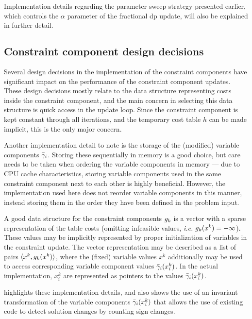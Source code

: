 Implementation details regarding the parameter sweep strategy presented earlier, which controls the \(\alpha\) parameter of the fractional \gls{dp} update, will also be explained in further detail.

\subsection{Constraint component design decisions}
Several design decisions in the implementation of the constraint components have significant impact on the performance of the constraint component updates.
These design decisions mostly relate to the data structure representing costs inside the constraint component, and the main concern in selecting this data structure is quick access in the update loop.
Since the constraint component is kept constant through all iterations, and the temporary cost table \(h\) can be made implicit, this is the only major concern.

Another implementation detail to note is the storage of the (modified) variable components \(\bar{\gamma}_i\).
Storing these sequentially in memory is a good choice, but care needs to be taken when ordering the variable components in memory --- due to CPU cache characteristics, storing variable components used in the same constraint component next to each other is highly beneficial.
However, the implementation used here does not reorder variable components in this manner, instead storing them in the order they have been defined in the problem input.

A good data structure for the constraint components \(g_k\) is a vector with a sparse representation of the table costs (omitting infeasible values, \emph{i.e.} \(g_k(x^k) = -\infty\)).
These values may be implicitly represented by proper initialization of variables in the constraint update.
The vector representation may be described as a list of pairs \(\langle x^k, g_k(x^k)\rangle\), where the (fixed) variable values \(x^k\) additionally may be used to access corresponding variable component values \(\bar{\gamma}_i(x^k_i)\).
In the actual implementation, \(x^k_i\) are represented as pointers to the values \(\bar{\gamma}_i(x^k_i)\).

 highlights these implementation details, and also shows the use of an invariant transformation of the variable components \(\bar{\gamma}_i(x^k_i)\) that allows the use of existing code to detect solution changes by counting sign changes.


